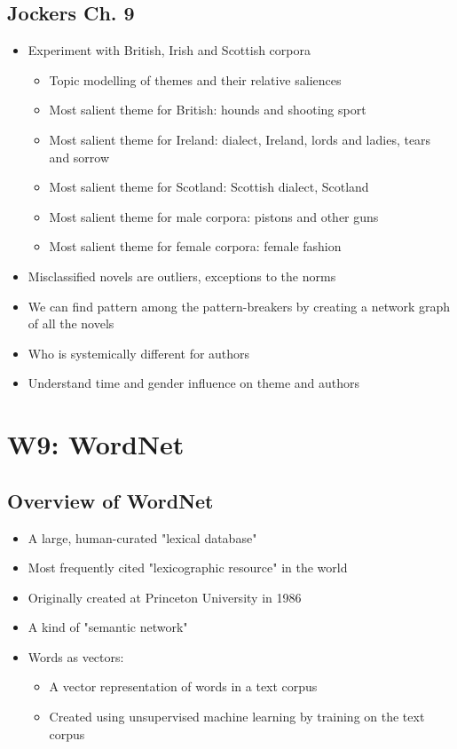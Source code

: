 \documentclass[a4paper]{article}
\begin{document}
\subsection{Jockers Ch. 9}
\begin{itemize}
    \item Experiment with British, Irish and Scottish corpora
    \begin{itemize}[label=$\circ$]
        \item Topic modelling of themes and their relative saliences
        \item Most salient theme for British: hounds and shooting sport
        \item Most salient theme for Ireland: dialect, Ireland, lords and ladies, tears and sorrow
        \item Most salient theme for Scotland: Scottish dialect, Scotland
        \item Most salient theme for male corpora: pistons and other guns
        \item Most salient theme for female corpora: female fashion
    \end{itemize}
    \item Misclassified novels are outliers, exceptions to the norms
    \item We can find pattern among the pattern-breakers by creating a network graph of all the novels
    \item Who is systemically different for authors
    \item Understand time and gender influence on theme and authors
\end{itemize}

\newpage
\section{W9: WordNet}
\subsection{Overview of WordNet}
\begin{itemize}
    \item A large, human-curated "lexical database"
    \item Most frequently cited "lexicographic resource" in the world
    \item Originally created at Princeton University in 1986
    \item A kind of "semantic network"
    \medskip
    \item Words as vectors:
    \begin{itemize}[label=$\circ$]
        \item A vector representation of words in a text corpus
        \item Created using unsupervised machine learning by training on the text corpus
    \end{itemize}
\end{itemize} 
\end{document}
